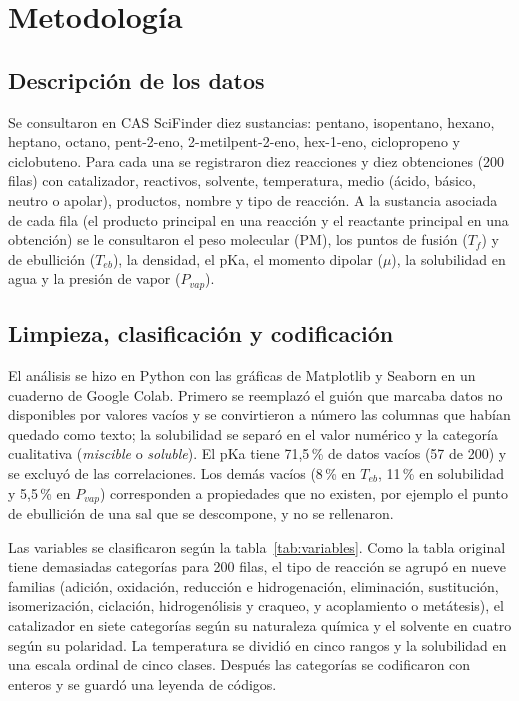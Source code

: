 \documentclass[twoside,twocolumn,10pt]{article}
\begin{document}
\section{Metodología}
\subsection{Descripci\'on de los datos}
Se consultaron en CAS SciFinder \cite{SciFinder} diez sustancias: pentano, isopentano, hexano, heptano, octano, pent-2-eno, 2-metilpent-2-eno, hex-1-eno, ciclopropeno y ciclobuteno. Para cada una se registraron diez reacciones y diez obtenciones (200 filas) con catalizador, reactivos, solvente, temperatura, medio (\'acido, b\'asico, neutro o apolar), productos, nombre y tipo de reacci\'on. A la sustancia asociada de cada fila (el producto principal en una reacci\'on y el reactante principal en una obtenci\'on) se le consultaron el peso molecular (PM), los puntos de fusi\'on ($T_f$) y de ebullici\'on ($T_{eb}$), la densidad, el pKa, el momento dipolar ($\mu$), la solubilidad en agua y la presi\'on de vapor ($P_{vap}$).

\subsection{Limpieza, clasificaci\'on y codificaci\'on}
El an\'alisis se hizo en Python \cite{Harris2020,McKinney2010,Virtanen2020} con las gr\'aficas de Matplotlib y Seaborn \cite{Hunter2007,Waskom2021} en un cuaderno de Google Colab. Primero se reemplaz\'o el gui\'on que marcaba datos no disponibles por valores vac\'ios y se convirtieron a n\'umero las columnas que hab\'ian quedado como texto; la solubilidad se separ\'o en el valor num\'erico y la categor\'ia cualitativa (\textit{miscible} o \textit{soluble}). El pKa tiene 71,5\,\% de datos vac\'ios (57 de 200) y se excluy\'o de las correlaciones. Los dem\'as vac\'ios (8\,\% en $T_{eb}$, 11\,\% en solubilidad y 5,5\,\% en $P_{vap}$) corresponden a propiedades que no existen, por ejemplo el punto de ebullici\'on de una sal que se descompone, y no se rellenaron.

Las variables se clasificaron seg\'un la tabla~\ref{tab:variables}. Como la tabla original tiene demasiadas categor\'ias para 200 filas, el tipo de reacci\'on se agrup\'o en nueve familias (adici\'on, oxidaci\'on, reducci\'on e hidrogenaci\'on, eliminaci\'on, sustituci\'on, isomerizaci\'on, ciclaci\'on, hidrogen\'olisis y craqueo, y acoplamiento o met\'atesis), el catalizador en siete categor\'ias seg\'un su naturaleza qu\'imica y el solvente en cuatro seg\'un su polaridad. La temperatura se dividi\'o en cinco rangos y la solubilidad en una escala ordinal de cinco clases. Despu\'es las categor\'ias se codificaron con enteros y se guard\'o una leyenda de c\'odigos.
\end{document}
